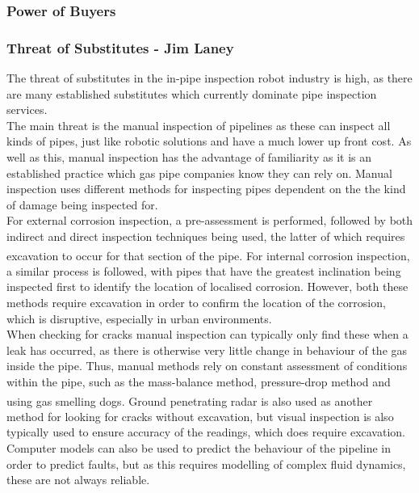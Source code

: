 \documentclass[11pt]{article}		%
\newcommand{\supercite}[1]{\textsuperscript{\cite{#1}}}		%
\begin{document}
			\subsubsection{Power of Buyers}
			
			\subsubsection{Threat of Substitutes - Jim Laney}
				
				The threat of substitutes in the in-pipe inspection robot industry is high, as there are many established substitutes which currently dominate pipe inspection services.
				\\
				The main threat is the manual inspection of pipelines as these can inspect all kinds of pipes, just like robotic solutions and have a much lower up front cost.
				As well as this, manual inspection has the advantage of familiarity as it is an established practice which gas pipe companies know they can rely on.
				Manual inspection uses different methods for inspecting pipes dependent on the the kind of damage being inspected for.
				\\
				For external corrosion inspection, a pre-assessment is performed, followed by both indirect and direct inspection techniques being used, the latter of which requires excavation to occur for that section of the pipe\supercite{kishawy2010review}. 
				For internal corrosion inspection, a similar process is followed, with pipes that have the greatest inclination being inspected first to identify the location of localised corrosion. 
				However, both these methods require excavation in order to confirm the location of the corrosion, which is disruptive, especially in urban environments.
				\\
				When checking for cracks manual inspection can typically only find these when a leak has occurred, as there is otherwise very little change in behaviour of the gas inside the pipe.
				Thus, manual methods rely on constant assessment of conditions within the pipe, such as the mass-balance method, pressure-drop method and using gas smelling dogs\supercite{kishawy2010review}.
				Ground penetrating radar is also used as another method for looking for cracks without excavation, but visual inspection is also typically used to ensure accuracy of the readings, which does require excavation.
				Computer models can also be used to predict the behaviour of the pipeline in order to predict faults, but as this requires modelling of complex fluid dynamics, these are not always reliable.
\end{document}
